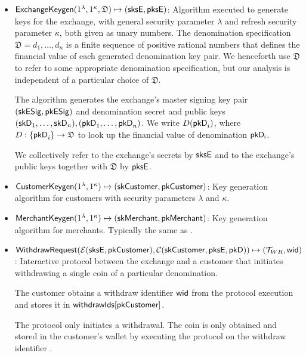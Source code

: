 \begin{itemize}
  \item $\mathsf{ExchangeKeygen}(1^{\lambda}, 1^{\kappa}, \mathfrak{D}) \mapsto (\mathsf{sksE}, \mathsf{pksE})$:
    Algorithm executed to generate keys for the exchange, with general security
    parameter $\lambda$ and refresh security parameter $\kappa$, both given as
    unary numbers.  The denomination specification $\mathfrak{D} = d_1,\dots,d_n$ is a
    finite sequence of positive rational numbers that defines the financial
    value of each generated denomination key pair.  We henceforth use $\mathfrak{D}$ to
    refer to some appropriate denomination specification, but our analysis is
    independent of a particular choice of $\mathfrak{D}$.

    The algorithm generates the exchange's master signing key pair
    $(\mathsf{skESig}, \mathsf{pkESig})$ and denomination secret and public keys
    $(\mathsf{skD}_1, \dots, \mathsf{skD}_n), (\mathsf{pkD}_1, \dots, \mathsf{pkD}_n)$.  We write
    $D(\mathsf{pkD}_i)$, where $D : \{\mathsf{pkD}_i\} \rightarrow \mathfrak{D}$ to look
    up the financial value of denomination $\mathsf{pkD_i}$.

    We collectively refer to the exchange's secrets by $\mathsf{sksE}$ and to the exchange's
    public keys together with $\mathfrak{D}$ by $\mathsf{pksE}$.

  \item $\mathsf{CustomerKeygen}(1^\lambda,1^\kappa) \mapsto (\mathsf{skCustomer}, \mathsf{pkCustomer})$:
    Key generation algorithm for customers with security parameters $\lambda$
    and $\kappa$.

  \item $\mathsf{MerchantKeygen}(1^\lambda,1^\kappa) \mapsto (\mathsf{skMerchant},
    \mathsf{pkMerchant})$: Key generation algorithm for merchants.  Typically the
    same as .

  \item $\mathsf{WithdrawRequest}(\mathcal{E}(\mathsf{sksE}, \mathsf{pkCustomer}),
    \mathcal{C}(\mathsf{skCustomer}, \mathsf{pksE}, \mathsf{pkD})) \mapsto (\mathcal{T}_{WR},
    \mathsf{wid})$: Interactive protocol between the exchange and a customer that
    initiates withdrawing a single coin of a particular denomination.  

    The customer obtains a withdraw identifier $\mathsf{wid}$ from the protocol
    execution and stores it in $\mathsf{withdrawIds}[\mathsf{pkCustomer}]$.

    The  protocol only initiates a withdrawal.  The coin
    is only obtained and stored in the customer's wallet by executing the
     protocol on the withdraw identifier .


\end{itemize}
